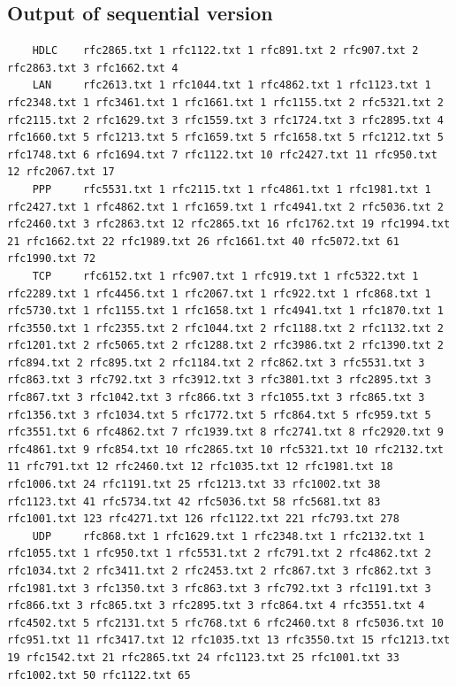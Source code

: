 \documentclass[11pt, letterpaper]{article}
\begin{document}
	\subsection{Output of sequential version}
	\vspace{-0.2in}
	\begin{lstlisting}
	HDLC    rfc2865.txt 1 rfc1122.txt 1 rfc891.txt 2 rfc907.txt 2 rfc2863.txt 3 rfc1662.txt 4
	LAN     rfc2613.txt 1 rfc1044.txt 1 rfc4862.txt 1 rfc1123.txt 1 rfc2348.txt 1 rfc3461.txt 1 rfc1661.txt 1 rfc1155.txt 2 rfc5321.txt 2 rfc2115.txt 2 rfc1629.txt 3 rfc1559.txt 3 rfc1724.txt 3 rfc2895.txt 4 rfc1660.txt 5 rfc1213.txt 5 rfc1659.txt 5 rfc1658.txt 5 rfc1212.txt 5 rfc1748.txt 6 rfc1694.txt 7 rfc1122.txt 10 rfc2427.txt 11 rfc950.txt 12 rfc2067.txt 17
	PPP     rfc5531.txt 1 rfc2115.txt 1 rfc4861.txt 1 rfc1981.txt 1 rfc2427.txt 1 rfc4862.txt 1 rfc1659.txt 1 rfc4941.txt 2 rfc5036.txt 2 rfc2460.txt 3 rfc2863.txt 12 rfc2865.txt 16 rfc1762.txt 19 rfc1994.txt 21 rfc1662.txt 22 rfc1989.txt 26 rfc1661.txt 40 rfc5072.txt 61 rfc1990.txt 72
	TCP     rfc6152.txt 1 rfc907.txt 1 rfc919.txt 1 rfc5322.txt 1 rfc2289.txt 1 rfc4456.txt 1 rfc2067.txt 1 rfc922.txt 1 rfc868.txt 1 rfc5730.txt 1 rfc1155.txt 1 rfc1658.txt 1 rfc4941.txt 1 rfc1870.txt 1 rfc3550.txt 1 rfc2355.txt 2 rfc1044.txt 2 rfc1188.txt 2 rfc1132.txt 2 rfc1201.txt 2 rfc5065.txt 2 rfc1288.txt 2 rfc3986.txt 2 rfc1390.txt 2 rfc894.txt 2 rfc895.txt 2 rfc1184.txt 2 rfc862.txt 3 rfc5531.txt 3 rfc863.txt 3 rfc792.txt 3 rfc3912.txt 3 rfc3801.txt 3 rfc2895.txt 3 rfc867.txt 3 rfc1042.txt 3 rfc866.txt 3 rfc1055.txt 3 rfc865.txt 3 rfc1356.txt 3 rfc1034.txt 5 rfc1772.txt 5 rfc864.txt 5 rfc959.txt 5 rfc3551.txt 6 rfc4862.txt 7 rfc1939.txt 8 rfc2741.txt 8 rfc2920.txt 9 rfc4861.txt 9 rfc854.txt 10 rfc2865.txt 10 rfc5321.txt 10 rfc2132.txt 11 rfc791.txt 12 rfc2460.txt 12 rfc1035.txt 12 rfc1981.txt 18 rfc1006.txt 24 rfc1191.txt 25 rfc1213.txt 33 rfc1002.txt 38 rfc1123.txt 41 rfc5734.txt 42 rfc5036.txt 58 rfc5681.txt 83 rfc1001.txt 123 rfc4271.txt 126 rfc1122.txt 221 rfc793.txt 278
	UDP     rfc868.txt 1 rfc1629.txt 1 rfc2348.txt 1 rfc2132.txt 1 rfc1055.txt 1 rfc950.txt 1 rfc5531.txt 2 rfc791.txt 2 rfc4862.txt 2 rfc1034.txt 2 rfc3411.txt 2 rfc2453.txt 2 rfc867.txt 3 rfc862.txt 3 rfc1981.txt 3 rfc1350.txt 3 rfc863.txt 3 rfc792.txt 3 rfc1191.txt 3 rfc866.txt 3 rfc865.txt 3 rfc2895.txt 3 rfc864.txt 4 rfc3551.txt 4 rfc4502.txt 5 rfc2131.txt 5 rfc768.txt 6 rfc2460.txt 8 rfc5036.txt 10 rfc951.txt 11 rfc3417.txt 12 rfc1035.txt 13 rfc3550.txt 15 rfc1213.txt 19 rfc1542.txt 21 rfc2865.txt 24 rfc1123.txt 25 rfc1001.txt 33 rfc1002.txt 50 rfc1122.txt 65
	\end{lstlisting}
	
\end{document}
